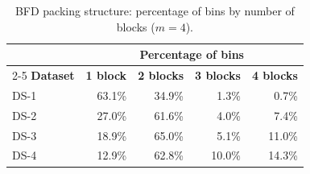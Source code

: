 \begin{table}[htbp]
\centering
\caption{BFD packing structure: percentage of bins by number of blocks ($m = 4$).}
\label{tab:bfd_packing}
\begin{tabular}{@{}lrrrr@{}}
\toprule
& \multicolumn{4}{c}{\textbf{Percentage of bins}} \\
\cmidrule(l){2-5}
\textbf{Dataset}
  & \textbf{1 block}
  & \textbf{2 blocks}
  & \textbf{3 blocks}
  & \textbf{4 blocks} \\
\midrule
DS-1 & 63.1\% & 34.9\% & 1.3\% & 0.7\% \\
DS-2 & 27.0\% & 61.6\% & 4.0\% & 7.4\% \\
DS-3 & 18.9\% & 65.0\% & 5.1\% & 11.0\% \\
DS-4 & 12.9\% & 62.8\% & 10.0\% & 14.3\% \\
\bottomrule
\end{tabular}
\end{table}